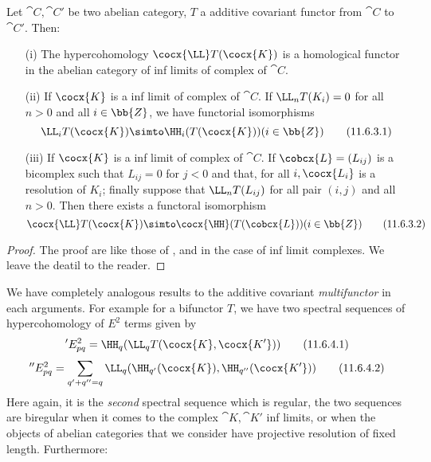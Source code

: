 \begin{proposition}[11.6.3]
Let $\cat{C}, \cat{C'}$ be two abelian category, $T$ a additive covariant functor from $\cat{C}$ to $\cat{C'}$. Then: 
\begin{enumerate}
  \item[(i)] The hypercohomology $\cocx{\LL} T(\cocx{K})$ is a homological functor in the abelian category of inf limits of complex of $\cat{C}$.
  \item[(ii)] If $\cocx{K}$ is a inf limit of complex of $\cat{C}$. If $\LL_n T(K_i) = 0$ for all $n>0$ and all $i\in \bb{Z}$, we have functorial isomorphisms 
  \[
    \label{0.11.6.3.1}
    \LL_i T(\cocx{K}) \simto \HH_i(T(\cocx{K}))
    (i\in \bb{Z})
    \tag{11.6.3.1}
  \]
  \item[(iii)] If $\cocx{K}$ is a inf limit of complex of $\cat{C}$. If $\cobcx{L} = (L_{ij})$ is a bicomplex such that $L_{ij} = 0$ for $j<0$ and that, 
  for all $i, \cocx{L_i}$ is a resolution of $K_i$; finally suppose that $\LL_n T(L_{ij})$ for all pair $(i,j)$ and all $n>0$. 
  Then there exists a functoral isomorphism
  \[
    \label{0.11.6.3.2}
    \cocx{\LL} T(\cocx{K}) \simto \cocx{\HH} (T(\cobcx{L}))
    (i\in \bb{Z})
    \tag{11.6.3.2}
  \]
\end{enumerate}
\end{proposition}

\begin{proof}
The proof are like those of ,  and  in the case of inf limit complexes. 
We leave the deatil to the reader.
\end{proof}

\begin{env}[11.6.4]
We have completely analogous results to the additive covariant \emph{multifunctor} in each arguments. 
For example for a bifunctor $T$, we have two spectral sequences of hypercohomology of $E^2$ terms given by 
\[
  \label{0.11.6.4.1}
  'E_{pq}^2 = \HH_q(\LL_q T(\cocx{K}, \cocx{K'}))
  \tag{11.6.4.1}
\]
\[
  \label{0.11.6.4.2}
  ''E_{pq}^2 = \sum_{q'+q''=q}\LL_q(\HH_{q'}(\cocx{K}), \HH_{q''}(\cocx{K'}))
  \tag{11.6.4.2}
\]
Here again, it is the \emph{second} spectral sequence which is regular, the two sequences are biregular when it comes to the complex $\cat{K}, \cat{K'}$ inf limits, 
or when the objects of abelian categories that we consider have projective resolution of fixed length. Furthermore: 
\end{env}

